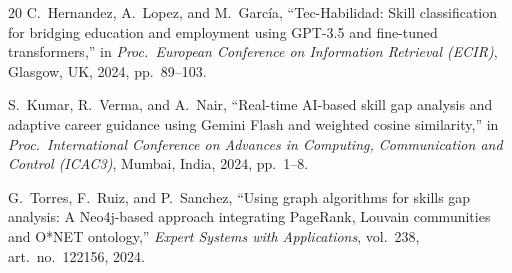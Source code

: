 \documentclass[12pt,a4paper]{report}
\begin{document}
\begin{thebibliography}{20}
C.~Hernandez, A.~Lopez, and M.~García,
``Tec-Habilidad: Skill classification for bridging education and employment using GPT-3.5 and fine-tuned transformers,''
in \textit{Proc.\ European Conference on Information Retrieval (ECIR)}, Glasgow, UK, 2024, pp.~89--103.

S.~Kumar, R.~Verma, and A.~Nair,
``Real-time AI-based skill gap analysis and adaptive career guidance using Gemini Flash and weighted cosine similarity,''
in \textit{Proc.\ International Conference on Advances in Computing, Communication and Control (ICAC3)}, Mumbai, India, 2024, pp.~1--8.

G.~Torres, F.~Ruiz, and P.~Sanchez,
``Using graph algorithms for skills gap analysis: A Neo4j-based approach integrating PageRank, Louvain communities and O*NET ontology,''
\textit{Expert Systems with Applications}, vol.~238, art.\ no.\ 122156, 2024.

\end{thebibliography}
\end{document}

